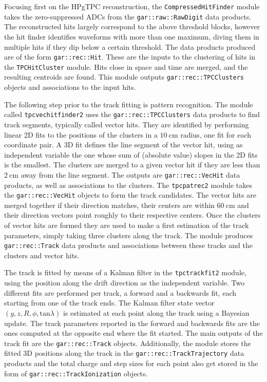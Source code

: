 Focusing first on the HPgTPC reconstruction, the \texttt{CompressedHitFinder} module takes the zero-suppressed ADCs from the \texttt{gar::raw::RawDigit} data products. The reconstructed hits largely correspond to the above threshold blocks, however the hit finder identifies waveforms with more than one maximum, diving them in multiple hits if they dip below a certain threshold. The data products produced are of the form \texttt{gar::rec::Hit}. These are the inputs to the clustering of hits in the \texttt{TPCHitCluster} module. Hits close in space and time are merged, and the resulting centroids are found. This module outputs \texttt{gar::rec::TPCClusters} objects and associations to the input hits.

The following step prior to the track fitting is pattern recognition. The module called \texttt{tpcvechitfinder2} uses the \texttt{gar::rec::TPCClusters} data products to find track segments, typically called vector hits. They are identified by performing linear 2D fits to the positions of the clusters in a $10~\mathrm{cm}$ radius, one fit for each coordinate pair. A 3D fit defines the line segment of the vector hit, using as independent variable the one whose sum of (absolute value) slopes in the 2D fits is the smallest. The clusters are merged to a given vector hit if they are less than $2~\mathrm{cm}$ away from the line segment. The outputs are \texttt{gar::rec::VecHit} data products, as well as associations to the clusters. The \texttt{tpcpatrec2} module takes the \texttt{gar::rec::VecHit} objects to form the track candidates. The vector hits are merged together if their direction matches, their centers are within $60~\mathrm{cm}$ and their direction vectors point roughly to their respective centers. Once the clusters of vector hits are formed they are used to make a first estimation of the track parameters, simply taking three clusters along the track. The module produces \texttt{gar::rec::Track} data products and associations between these tracks and the clusters and vector hits.

The track is fitted by means of a Kalman filter in the \texttt{tpctrackfit2} module, using the position along the drift direction as the independent variable. Two different fits are performed per track, a forward and a backwards fit, each starting from one of the track ends. The Kalman filter state vector $(y,z,R,\phi,\mathrm{tan}\lambda)$ is estimated at each point along the track using a Bayesian update. The track parameters reported in the forward and backwards fits are the ones computed at the opposite end where the fit started. The main outputs of the track fit are the \texttt{gar::rec::Track} objects. Additionally, the module stores the fitted 3D positions along the track in the \texttt{gar::rec::TrackTrajectory} data products and the total charge and step sizes for each point also get stored in the form of \texttt{gar::rec::TrackIonization} objects.

